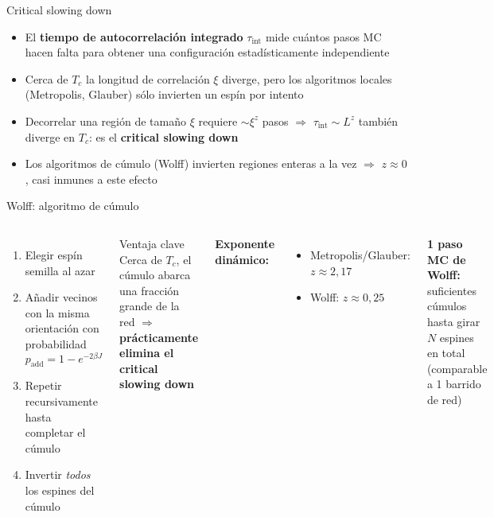 \documentclass[10pt, aspectratio=169]{beamer}
\begin{document}
\begin{frame}{Critical slowing down}
  \begin{itemize}
    \item El \textbf{tiempo de autocorrelación integrado} $\tau_{\text{int}}$ mide cuántos pasos MC hacen falta para obtener una configuración estadísticamente independiente
    \item Cerca de $T_c$ la longitud de correlación $\xi$ diverge, pero los algoritmos locales (Metropolis, Glauber) sólo invierten un espín por intento
    \item Decorrelar una región de tamaño $\xi$ requiere $\sim\xi^z$ pasos $\Rightarrow$ $\tau_{\text{int}}\sim L^z$ también diverge en $T_c$: es el \textbf{critical slowing down}
    \item Los algoritmos de cúmulo (Wolff) invierten regiones enteras a la vez $\Rightarrow$ $z\approx 0$, casi inmunes a este efecto
  \end{itemize}
\end{frame}

\begin{frame}{Wolff: algoritmo de cúmulo}
  \begin{columns}
      \begin{enumerate}
        \item Elegir espín semilla al azar
        \item Añadir vecinos con la misma orientación con probabilidad
          \[ p_{\text{add}} = 1 - e^{-2\beta J} \]
        \item Repetir recursivamente hasta completar el cúmulo
        \item Invertir \emph{todos} los espines del cúmulo
      \end{enumerate}

      \medskip
      \begin{block}{Ventaja clave}
        Cerca de $T_c$, el cúmulo abarca una fracción grande de la red $\Rightarrow$ \textbf{prácticamente elimina el critical slowing down}
      \end{block}

      \textbf{Exponente dinámico:}
      \begin{itemize}
        \item Metropolis/Glauber: $z \approx 2{,}17$
        \item Wolff: $z \approx 0{,}25$
      \end{itemize}

      \medskip
      \textbf{1 paso MC de Wolff:}\\
      suficientes cúmulos hasta girar $N$ espines en total (comparable a 1 barrido de red)
  \end{columns}
\end{frame}
\end{document}

